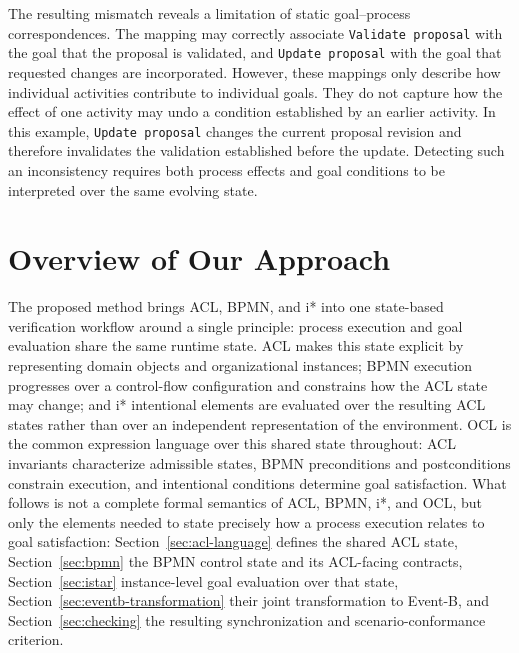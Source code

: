 \documentclass[a4paper, conference]{IEEEtran}
\begin{document}
The resulting mismatch reveals a limitation of static goal--process correspondences. The
mapping may correctly associate \texttt{Validate proposal} with the goal that
the proposal is validated, and \texttt{Update proposal} with the goal that
requested changes are incorporated. However, these mappings only describe how
individual activities contribute to individual goals. They do not capture how
the effect of one activity may undo a condition established by an earlier
activity. In this example, \texttt{Update proposal} changes the current
proposal revision and therefore invalidates the validation established before
the update. Detecting such an inconsistency requires both process effects and
goal conditions to be interpreted over the same evolving state.

\section{Overview of Our Approach}
\label{sect:overview}

The proposed method brings ACL, BPMN, and i* into one state-based verification workflow around a single principle: process execution and goal evaluation share the same runtime state. ACL makes this state explicit by representing domain objects and organizational instances; BPMN execution progresses over a control-flow configuration and constrains how the ACL state may change; and i* intentional elements are evaluated over the resulting ACL states rather than over an independent representation of the environment. OCL is the common expression language over this shared state throughout: ACL invariants characterize admissible states, BPMN preconditions and postconditions constrain execution, and intentional conditions determine goal satisfaction. What follows is not a complete formal semantics of ACL, BPMN, i*, and OCL, but only the elements needed to state precisely how a process execution relates to goal satisfaction: Section~\ref{sec:acl-language} defines the shared ACL state, Section~\ref{sec:bpmn} the BPMN control state and its ACL-facing contracts, Section~\ref{sec:istar} instance-level goal evaluation over that state, Section~\ref{sec:eventb-transformation} their joint transformation to Event-B, and Section~\ref{sec:checking} the resulting synchronization and scenario-conformance criterion.
\end{document}
